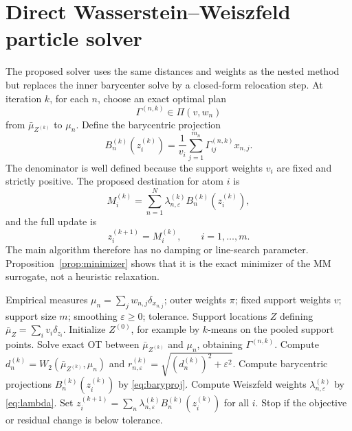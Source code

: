 \documentclass[pdflatex,sn-mathphys-ay]{sn-jnl}%
\theoremstyle{thmstyleone}%
\theoremstyle{thmstyletwo}%
\theoremstyle{thmstylethree}%
\newcommand{\eps}{\varepsilon}
\newcommand{\barmu}{\bar\mu}
\begin{document}
\section{Direct Wasserstein--Weiszfeld particle solver}\label{sec:algorithm}

The proposed solver uses the same distances and weights as the nested method but replaces the inner barycenter solve by a closed-form relocation step. At iteration \(k\), for each \(n\), choose an exact optimal plan
\[
    \Gamma^{(n,k)}\in\Pi(v,w_n)
\]
from \(\barmu_{Z^{(k)}}\) to \(\mu_n\). Define the barycentric projection
\begin{equation}\label{eq:baryproj}
    B_n^{(k)}(z_i^{(k)})
    =
    \frac{1}{v_i}\sum_{j=1}^{m_n}\Gamma_{ij}^{(n,k)}x_{n,j}.
\end{equation}
The denominator is well defined because the support weights \(v_i\) are fixed and strictly positive. The proposed destination for atom \(i\) is
\begin{equation}\label{eq:destination}
    M_i^{(k)}=
    \sum_{n=1}^N\lambda_{n,\eps}^{(k)}B_n^{(k)}(z_i^{(k)}),
\end{equation}
and the full update is
\begin{equation}\label{eq:full-update}
    z_i^{(k+1)}=M_i^{(k)},
    \qquad i=1,\ldots,m.
\end{equation}
The main algorithm therefore has no damping or line-search parameter. Proposition~\ref{prop:minimizer} shows that it is the exact minimizer of the MM surrogate, not a heuristic relaxation.

\begin{algorithm}[ht]
\caption{Direct fixed-weight free-support Wasserstein--Weiszfeld solver}\label{alg:direct}
\begin{algorithmic}[1]
\REQUIRE Empirical measures \(\mu_n=\sum_j w_{n,j}\delta_{x_{n,j}}\); outer weights \(\pi\); fixed support weights \(v\); support size \(m\); smoothing \(\eps\ge0\); tolerance.
\ENSURE Support locations \(Z\) defining \(\barmu_Z=\sum_i v_i\delta_{z_i}\).
\STATE Initialize \(Z^{(0)}\), for example by \(k\)-means on the pooled support points.
        \STATE Solve exact OT between \(\barmu_{Z^{(k)}}\) and \(\mu_n\), obtaining \(\Gamma^{(n,k)}\).
        \STATE Compute \(d_n^{(k)}=W_2(\barmu_{Z^{(k)}},\mu_n)\) and \(r_{n,\eps}^{(k)}=\sqrt{(d_n^{(k)})^2+\eps^2}\).
        \STATE Compute barycentric projections \(B_n^{(k)}(z_i^{(k)})\) by \eqref{eq:baryproj}.
    \ENDFOR
    \STATE Compute Weiszfeld weights \(\lambda_{n,\eps}^{(k)}\) by \eqref{eq:lambda}.
    \STATE Set \(z_i^{(k+1)}=\sum_n\lambda_{n,\eps}^{(k)}B_n^{(k)}(z_i^{(k)})\) for all \(i\).
    \STATE Stop if the objective or residual change is below tolerance.
\ENDFOR
\end{algorithmic}
\end{algorithm}
\end{document}
